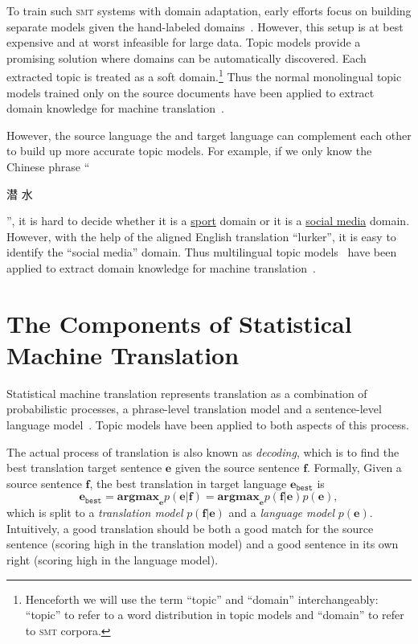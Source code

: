 To train such \textsc{smt} systems with domain adaptation, early
efforts focus on building separate models given the hand-labeled
domains~\citep{foster-07,matsoukas-09,chiang-11}. However, this setup
is at best expensive and at worst infeasible for large data.  Topic
models provide a promising solution where domains can be automatically
discovered. Each extracted topic is treated as a soft
domain.\footnote{Henceforth we will use the term ``topic'' and
  ``domain'' interchangeably: ``topic'' to refer to  a word distribution in
  topic models and ``domain'' to refer to \textsc{smt} corpora.} Thus
the normal monolingual topic models trained only on the source documents have
been applied to extract domain knowledge for machine
translation~\citep{Eidelman-12}.

However, the source language the and target language can complement
each other to build up more accurate topic models. For example, if we
only know the Chinese phrase ``\begin{CJK*}{UTF8}{gbsn}潜
  水\end{CJK*}'', it is hard to decide whether it is a
  \underline{sport} domain or it is a \underline{social media}
  domain. However, with the help of the aligned English translation
  ``lurker'', it is easy to identify the ``social media'' domain. Thus
  multilingual topic models~\citep{ni-09,DeSmet-09,mimno-09,boyd-graber-10} have been
  applied to extract domain knowledge for machine
  translation~\citep{hu-14}.

\section{The Components of Statistical Machine Translation}

Statistical machine translation represents translation as a
combination of probabilistic processes, a phrase-level translation model and a sentence-level language model~\citep{koehn-03,koehn-09}. 
Topic models have been applied to both aspects of this process.

The actual process of translation is also known as \textit{decoding},
which is to find the best translation target sentence $\mathbf{e}$ 
given the source sentence $\mathbf{f}$. Formally,
Given a source sentence $\mathbf{f}$, the best
translation in target language $\mathbf{e}_\texttt{best}$ is
\begin{equation}
\mathbf{e}_\texttt{best} = \textbf{argmax}_\mathbf{e} p(\mathbf{e}|\mathbf{f}) = \textbf{argmax}_\mathbf{e} p(\mathbf{f}|\mathbf{e}) p (\mathbf{e}),
\end{equation}
which is split to a \textit{translation model}
$p(\mathbf{f}|\mathbf{e})$ and a \textit{language model} $p
(\mathbf{e})$.
Intuitively, a good translation should be both a good match for the source sentence (scoring high in the translation model) 
and a good sentence in its own right (scoring high in the language model).


